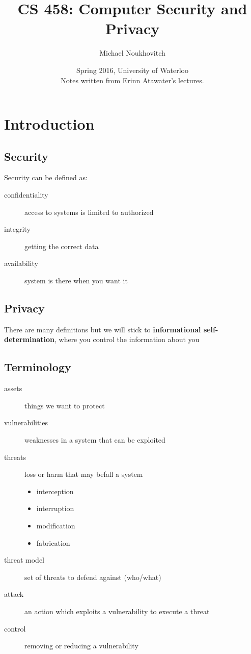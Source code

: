 \documentclass[]{article}
\theoremstyle{definition}
\begin{document}
	\let\ref\Cref

	\title{\bf{CS 458: Computer Security and Privacy}}
	\date{Spring 2016, University of Waterloo \\ \center Notes written from Erinn Atawater's lectures.}
	\author{Michael Noukhovitch}

	\maketitle
	\newpage
	\tableofcontents
	\newpage

	\section{Introduction}
	\subsection{Security}
	Security can be defined as:
	\begin{description}
		\item[confidentiality] access to systems is limited to authorized
		\item[integrity] getting the correct data
		\item[availability] system is there when you want it
	\end{description}
	\subsection{Privacy}
	There are many definitions but we will stick to \textbf{informational self-determination}, where you control the information about you

	\subsection{Terminology}
	\begin{description}
		\item[assets] things we want to protect
		\item[vulnerabilities] weaknesses in a system that can be exploited
		\item[threats] loss or harm that may befall a system
			\begin{itemize}
				\item interception
				\item interruption
				\item modification
				\item fabrication
			\end{itemize}
		\item[threat model] set of threats to defend against (who/what)
		\item[attack] an action which exploits a vulnerability to execute a threat
		\item[control] removing or reducing a vulnerability
	\end{description}
\end{document}
